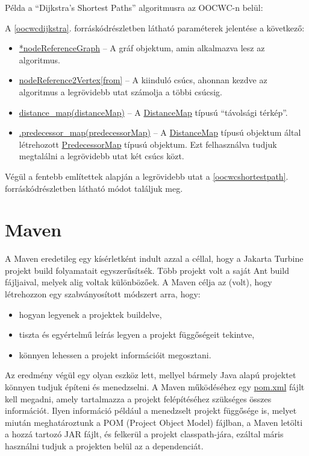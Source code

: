 \documentclass[a4paper,12pt]{report}
\begin{document}
Példa a ``Dijkstra's Shortest Paths'' algoritmusra az OOCWC-n belül:


A \ref{oocwcdijkstra}. forráskódrészletben látható paraméterek jelentése a következő:
\begin{itemize}
\item \url{*nodeReferenceGraph} -- A gráf objektum, amin alkalmazva lesz az algoritmus.
\item \url{nodeReference2Vertex[from]} -- A kiinduló csúcs, ahonnan kezdve az algoritmus a legrövidebb utat számolja a többi csúcsig.
\item \url{distance_map(distanceMap)} -- A \url{DistanceMap} típusú ``távolsági térkép''.
\item \url{.predecessor_map(predecessorMap)} -- A \url{DistanceMap} típusú objektum által létrehozott \url{PredecessorMap} típusú objektum. Ezt felhasználva tudjuk megtalálni a legrövidebb utat két csúcs közt.
\end{itemize}

Végül a fentebb említettek alapján a legrövidebb utat a \ref{oocwcshortestpath}. forráskódrészletben látható módot találjuk meg.



\newpage
\section{Maven}
\label{maven}

A Maven eredetileg egy kísérletként indult azzal a céllal, hogy a Jakarta Turbine projekt \cite{turbine} build folyamatait egyszerűsítsék. Több projekt volt a saját Ant \cite{ant} build fájljaival, melyek alig voltak különbözőek. A Maven célja az (volt), hogy létrehozzon egy szabványosított módszert arra, hogy:

\begin{itemize}
\item hogyan legyenek a projektek buildelve,
\item tiszta és egyértelmű leírás legyen a projekt függőségeit tekintve,
\item könnyen lehessen a projekt információit megosztani.
\end{itemize}

Az eredmény végül egy olyan eszköz lett, mellyel bármely Java alapú projektet könnyen tudjuk építeni és menedzselni. A Maven működéséhez egy \url{pom.xml} fájlt kell megadni, amely tartalmazza a projekt felépítéséhez szükséges összes információt. Ilyen információ például a menedzselt projekt függősége is, melyet miután meghatároztunk a POM (Project Object Model) fájlban, a Maven letölti a hozzá tartozó JAR fájlt, és felkerül a projekt classpath-jára, ezáltal máris használni tudjuk a projekten belül az a dependenciát.
\end{document}
